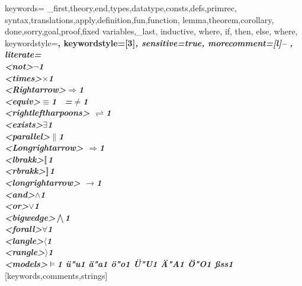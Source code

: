 
\usepackage{amsmath}
\usepackage{amsfonts}
\usepackage{amssymb}
\usepackage{mathtools}
\usepackage{caption}

\usepackage{verbatim}
\usepackage{pstricks,pst-node}
\usepackage{fancyvrb}
\usepackage{listings}
\newcommand{\nsubset}{\not\subset}
\newcommand{\setB}{{\mathord{\mathbb B}}}
\newcommand{\setC}{{\mathord{\mathbb C}}}
\newcommand{\setN}{{\mathord{\mathbb N}}}
\newcommand{\setQ}{{\mathord{\mathbb Q}}}
\newcommand{\setR}{{\mathord{\mathbb R}}}
\newcommand{\setZ}{{\mathord{\mathbb Z}}}
\newcommand{\coloncolon}{\mathrel{::}}
\newcommand{\lsemantics}{\mathopen{\lbrack\mkern-3mu\lbrack}}
\newcommand{\rsemantics}{\mathclose{\rbrack\mkern-3mu\rbrack}}
\newcommand{\lcata}{\mathopen{(\mkern-3mu\mid}}
\newcommand{\rcata}{\mathclose{\mid\mkern-3mu)}}

%
  {keywords={
        _first,theory,end,types,datatype,consts,defs,primrec,
        syntax,translations,apply,definition,fun,function, lemma,theorem,corollary,
        done,sorry,goal,proof,fixed variables,_last, inductive, where, if, then, else, where},
    keywordstyle=\color{Data61 light forest}\bfseries,
    keywordstyle=[3]\itshape,
        sensitive=true,
        morecomment=[l]{-- },
        literate=
                {\\<not>}{{$¬$}}1 {\\<times>}{{$×$}}1                 
                {\\<Rightarrow>}{{$\Rightarrow$}}1%
                {\\<equiv>}{{$\equiv$}}1 {~=}{{$\not=$}}1                         
                {\\<rightleftharpoons>}
                        {{$\rightleftharpoons$}}1
                {\\<exists>}{{$\exists$}}1
                {\\<parallel>}{{$\parallel$}}1
                {\\<Longrightarrow>}
                        {{$\Longrightarrow$}}1
                 {\\<lbrakk>}{{$\lsemantics$}}1
                {\\<rbrakk>}{{$\rsemantics$}}1
                {\\<longrightarrow>}
                        {{$\longrightarrow$}}1
                {\\<and>}{{$\land$}}1
                {\\<or>}{{$\lor$}}1
                {\\<bigwedge>}{{$\bigwedge$}}1
                {\\<forall>}{{$\forall$}}1
                {\\<langle>}{{$\langle$}}1
                {\\<rangle>}{{$\rangle$}}1
                {\\<models>}{{$\models$}}1
                {ü}{"u}1 {ä}{"a}1 {ö}{"o}1
                {Ü}{"U}1 {Ä}{"A}1 {Ö}{"O}1 {ß}{{ss}}1
  }[keywords,comments,strings]%

